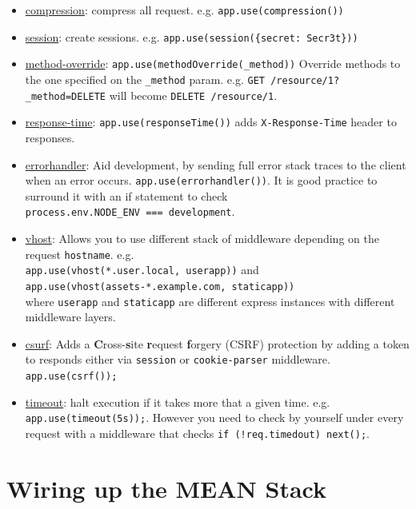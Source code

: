 \documentclass[12pt]{article}
\begin{document}
\begin{itemize}
\item
  \href{https://github.com/expressjs/compression}{compression}: compress
  all request. e.g. \texttt{app.use(compression())}
\item
  \href{https://github.com/expressjs/session}{session}: create sessions.
  e.g.
  \texttt{app.use(session(\{secret:\ Secr3t\}))}
\item
  \href{https://github.com/expressjs/method-override}{method-override}:
  \texttt{app.use(methodOverride(\_method))}
  Override methods to the one specified on the \texttt{\_method} param.
  e.g. \texttt{GET\ /resource/1?\_method=DELETE} will become
  \texttt{DELETE\ /resource/1}.
\item
  \href{https://github.com/expressjs/response-time}{response-time}:
  \texttt{app.use(responseTime())} adds \texttt{X-Response-Time} header
  to responses.
\item
  \href{https://github.com/expressjs/errorhandler}{errorhandler}: Aid
  development, by sending full error stack traces to the client when an
  error occurs. \texttt{app.use(errorhandler())}. It is good practice to
  surround it with an if statement to check
  \texttt{process.env.NODE\_ENV\ ===\ development}.
\item
  \href{https://github.com/expressjs/vhost}{vhost}: Allows you to use
  different stack of middleware depending on the request
  \texttt{hostname}. e.g.\\
  \texttt{app.use(vhost(*.user.local,\ userapp))}
  and\\
  \texttt{app.use(vhost(assets-*.example.com,\ staticapp))}\\
  where \texttt{userapp} and \texttt{staticapp} are different express
  instances with different middleware layers.
\item
  \href{https://github.com/expressjs/csurf}{csurf}: Adds a
  \textbf{C}ross-\textbf{s}ite \textbf{r}equest \textbf{f}orgery (CSRF)
  protection by adding a token to responds either via \texttt{session}
  or \texttt{cookie-parser} middleware. \texttt{app.use(csrf());}
\item
  \href{https://github.com/expressjs/timeout}{timeout}: halt execution
  if it takes more that a given time. e.g.
  \texttt{app.use(timeout(5s));}.
  However you need to check by yourself under every request with a
  middleware that checks \texttt{if\ (!req.timedout)\ next();}.
\end{itemize}

\section{Wiring up the MEAN Stack}
\end{document}
